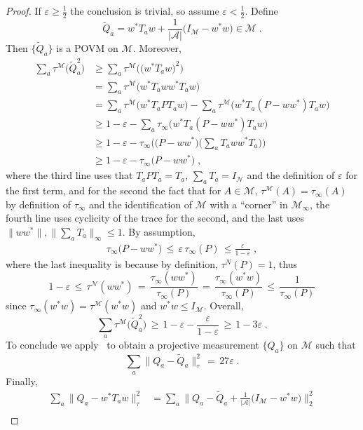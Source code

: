 \documentclass[11pt]{article}
\theoremstyle{definition}
\newcommand{\Id}{\ensuremath{I}}
\newcommand{\mA}{\ensuremath{\mathcal{A}}}
\newcommand{\mM}{\ensuremath{\mathcal{M}}}
\newcommand{\eps}{\varepsilon}
\newcommand{\mN}{\mathcal{N}}
\begin{document}
\begin{proof}
If $\eps\geq \frac{1}{2}$ the conclusion is trivial, so assume $\eps<\frac{1}{2}$. 
Define 
\[\tilde{Q}_a = w^* T_a w  + \frac{1}{|\mA|}\big(\Id_\mM - w^* w\big) \in \mM\;.\]
Then $\{\tilde{Q}_a\}$ is a POVM on $\mM$. Moreover, 
\begin{align*}
\sum_a \tau^\mM \big( \tilde{Q}_a^2 \big) &\geq \sum_a \tau^\mM \big( \big(w^* T_a w \big)^2 \big) \\
&= \sum_a \tau^\mM \big(  w^* T_a w w^*T_a w \big)\\
&= \sum_a \tau^\mM \big(  w^* T_a  P T_a w \big) - \sum_a \tau^\mM \big( w^* T_a  ( P - w w^*) T_a w \big)\\
&\geq 1 - \eps -  \sum_a \tau_\infty \big( w^* T_a  ( P - w w^*) T_a w \big)\\
&\geq 1 - \eps -  \tau_\infty\Big(\big( P - w w^*\big)\Big(\sum_a  T_a w w^* T_a\Big)\Big)\\ 
&\geq 1- \eps- \tau_\infty\big( P- w w^*\big)\;,
\end{align*}
where the third line uses that $T_aPT_a=T_a$, $\sum_a T_a = \Id_\mN$ and the definition of $\eps$ for the first term, and for the second the fact that for $A\in\mM$, $\tau^\mM(A)=\tau_\infty(A)$ by definition of $\tau_\infty$ and the identification of $\mM$ with a ``corner'' in $\mM_\infty$, the fourth line uses cyclicity of the trace for the second, and the last uses $\|ww^*\|,\|\sum_a T_a\|_\infty\leq 1$. By assumption, 
\begin{align}
\tau_\infty\big( P- w w^*\big) \,\leq\, \eps\, \tau_\infty(P)\,\leq \frac{\eps}{1-\eps}\;,\label{eq:bound_on_P-ww*_in_trace_infty}
\end{align}
where the last inequality is because by definition, $\tau^N(P)=1$, thus
\[1-\eps \,\leq\, \tau^\mN(ww^*) \,=\, \frac{\tau_\infty(ww^*)}{\tau_\infty(P)}\,=\, \frac{\tau_\infty(w^*w)}{\tau_\infty(P)}  \,\leq\, \frac{1}{\tau_\infty(P)}\]
since $\tau_\infty(w^* w) = \tau^\mM(w^* w)$ and $w^*w\leq I_\mM$. Overall, 
\[ \sum_a \tau^\mM \big( \tilde{Q}_a^2 \big) \,\geq\, 1-\eps-\frac{\eps}{1-\eps}\,\geq\, 1-3\eps\;.\]
To conclude we apply~\cite[Theorem 1.2]{de2021orthogonalization} to obtain a projective measurement $\{Q_a\}$ on $\mM$ such that 
\begin{equation*}
\sum_a \big\|{Q}_a - \tilde{Q}_a \big\|^2_\tau \,=\, 27\eps\;.
\end{equation*}
Finally,
\begin{align*}
\sum_a \big\|{Q}_a - w^*{T}_a w\big\|^2_\tau &= \sum_a \Big\|{Q}_a - \tilde{Q}_a  + \frac{1}{|\mA|}\big(I_\mM - w^* w\big) \Big\|^2_2\\

\end{align*}
\end{proof}
\end{document}
